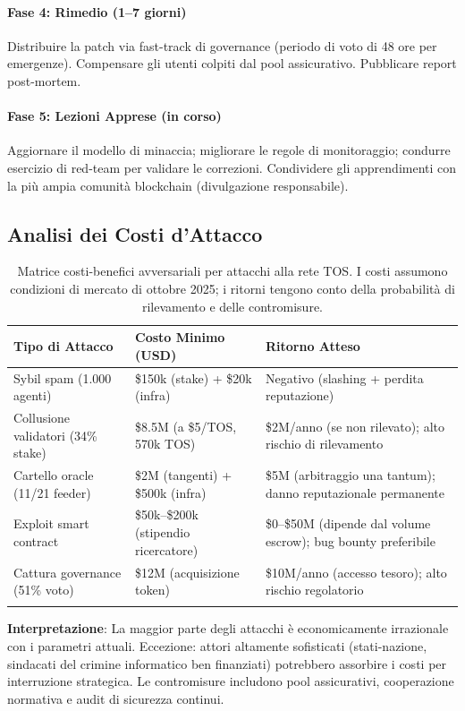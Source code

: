 \documentclass[11pt]{article}
\begin{document}
\begin{itemize}[noitemsep]
\paragraph{Fase 4: Rimedio (1--7 giorni)}
Distribuire la patch via fast-track di governance (periodo di voto di 48 ore per emergenze). Compensare gli utenti colpiti dal pool assicurativo. Pubblicare report post-mortem.

\paragraph{Fase 5: Lezioni Apprese (in corso)}
Aggiornare il modello di minaccia; migliorare le regole di monitoraggio; condurre esercizio di red-team per validare le correzioni. Condividere gli apprendimenti con la più ampia comunità blockchain (divulgazione responsabile).

\subsection{Analisi dei Costi d'Attacco}

\begin{longtable}{@{}p{}p{}p{}@{}}
\toprule
\textbf{Tipo di Attacco} & \textbf{Costo Minimo (USD)} & \textbf{Ritorno Atteso} \\\midrule
Sybil spam (1.000 agenti) & \$150k (stake) + \$20k (infra) & Negativo (slashing + perdita reputazione) \\
Collusione validatori (34\% stake) & \$8.5M (a \$5/TOS, 570k TOS) & \$2M/anno (se non rilevato); alto rischio di rilevamento \\
Cartello oracle (11/21 feeder) & \$2M (tangenti) + \$500k (infra) & \$5M (arbitraggio una tantum); danno reputazionale permanente \\
Exploit smart contract & \$50k--\$200k (stipendio ricercatore) & \$0--\$50M (dipende dal volume escrow); bug bounty preferibile \\
Cattura governance (51\% voto) & \$12M (acquisizione token) & \$10M/anno (accesso tesoro); alto rischio regolatorio \\
\bottomrule
\caption{Matrice costi-benefici avversariali per attacchi alla rete TOS. I costi assumono condizioni di mercato di ottobre 2025; i ritorni tengono conto della probabilità di rilevamento e delle contromisure.}
\end{longtable}

\textbf{Interpretazione}: La maggior parte degli attacchi è economicamente irrazionale con i parametri attuali. Eccezione: attori altamente sofisticati (stati-nazione, sindacati del crimine informatico ben finanziati) potrebbero assorbire i costi per interruzione strategica. Le contromisure includono pool assicurativi, cooperazione normativa e audit di sicurezza continui.


\end{itemize}
\end{document}
